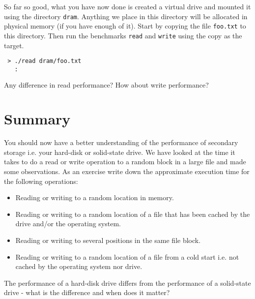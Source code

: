 \documentclass[a4paper,11pt]{article}
\begin{document}
So far so good, what you have now done is created a virtual drive and
mounted it using the directory {\tt dram}. Anything we place in this
directory will be allocated in physical memory (if you have enough of
it). Start by copying the file {\tt foo.txt} to this directory. Then
run the benchmarks {\tt read} and {\tt write} using the copy as the target.

\begin{verbatim}
 > ./read dram/foo.txt
   :
\end{verbatim}

Any difference in read performance? How about write performance?

\section{Summary}

You should now have a better understanding of the performance of
secondary storage i.e. your hard-disk or solid-state drive. We have
looked at the time it takes to do a read or write operation to a
random block in a large file and made some observations. As an
exercise write down the approximate execution time for the following
operations:


\begin{itemize}
\item Reading or writing to a random location in memory.

\item Reading or writing to a random location of a file that has been
  cached by the drive and/or the operating system.  

\item Reading or writing to several positions in the same file block. 

\item Reading or writing to a random location of a file from a cold
  start i.e. not cached by the operating system nor drive.

\end{itemize}

The performance of a hard-disk drive differs from the performance of a
solid-state drive - what is the difference and when does it matter?
\end{document}
